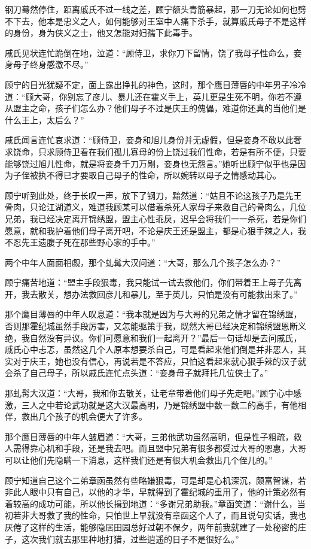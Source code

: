 钢刀蓦然停住，距离戚氏不过一线之差，顾宁额头青筋暴起，那一刀无论如何也劈不下去，他本是忠义之人，如何能够对王室中人痛下杀手，就算戚氏母子不是这样的身份，身为侠义之士，他又怎能对妇孺下此毒手。

戚氏见状连忙跪倒在地，泣道：“顾侍卫，求你刀下留情，饶了我母子性命么，妾身母子终身感激不尽。”

顾宁的目光犹疑不定，面上露出挣扎的神色，这时，那个鹰目薄唇的中年男子冷冷道：“顾大哥，你别忘了彦儿、暴儿还在霍义手上，英儿更是生死不明，你若不遵从盟主之命，孩子们怎么办？他们母子不过是庆王的傀儡，难道你还真的当他们是什么王上，太后么？”

戚氏闻言连忙哀求道：“顾侍卫，妾身和旭儿身份并无虚假，但是妾身不敢以此奢求饶命，只求顾侍卫看在我们孤儿寡母的份上饶过我们性命，若是有所不便，只要能够饶过旭儿性命，就是将妾身千刀万剐，妾身也无怨言。”她听出顾宁似乎也是因为子侄被执不得已才要取自己母子的性命，所以婉转以母子之情感动其心。

顾宁听到此处，终于长叹一声，放下了钢刀，黯然道：“姑且不论这孩子乃是先王骨肉，只论江湖道义，难道我顾某可以借着杀死人家母子来救自己的骨肉么，几位兄弟，我已经决定离开锦绣盟，盟主心性乖戾，迟早会将我们一一杀死，若是你们愿意，就和我护着他们母子离开吧，不论是庆王还是盟主，都是心狠手辣之人，我不忍先王遗腹子死在那些野心家的手中。”

两个中年人面面相觑，那个虬髯大汉问道：“大哥，那么几个孩子怎么办？”

顾宁痛苦地道：“盟主手段狠毒，我只能试一试去救他们，你们带着王上母子先离开，我去散关，想办法救回彦儿和暴儿，至于英儿，只怕是没有可能救出来了。”

那个鹰目薄唇的中年人叹息道：“我本就是因为与大哥的兄弟之情才留在锦绣盟，否则那霍纪城虽然手段厉害，又怎能驱策于我，既然大哥已经决定和锦绣盟恩断义绝，我自然没有异议。你们可愿意和我们一起离开？”最后一句话却是去问戚氏，戚氏心中忐忑，虽然这几个人原本想要杀自己，可是看起来他们倒是并非恶人，其实对于庆王，她也没有信心，再说若是不答应，只怕这看起来就心狠手辣的汉子就会杀了自己母子，所以戚氏连忙点头道：“妾身母子就拜托几位侠士了。”

那虬髯大汉道：“大哥，我和你去散关，让老章带着他们母子先走吧。”顾宁心中感激，三人之中若论武功就是这大汉最高明，乃是锦绣盟中数一数二的高手，有他相伴，救出几个孩子的机会便大了许多。

那个鹰目薄唇的中年人皱眉道：“大哥，三弟他武功虽然高明，但是性子粗疏，救人需得靠心机和手段，还是我去吧。而且盟中兄弟有很多都受过大哥的恩惠，大哥可以让他们先隐瞒一下消息，这样我们还是有很大机会救出几个侄儿的。”

顾宁知道自己这个二弟章函虽然有些略嫌狠毒，可是却是心机深沉，颇富智谋，若非此人眼中只有自己，以他的才华，早就得到了霍纪城的重用了，他的计策必然有着较高的成功可能，所以他长揖到地道：“多谢兄弟助我。”章函笑道：“谢什么，当初若非大哥救了我的性命，只怕世上早就没有章函这个人了，而且说句实话，我也厌倦了这样的生活，能够隐居田园总好过朝不保夕，两年前我就建了一处秘密的庄子，这次我们就去那里种地打猎，过些逍遥的日子不是很好么。”

